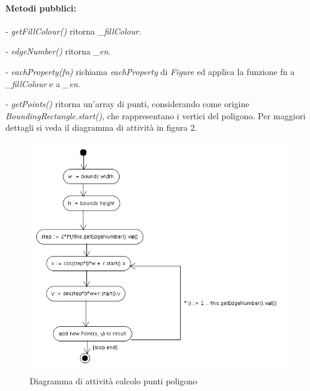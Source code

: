 \paragraph{Metodi pubblici:}
\begin{elencopuntato}[\subsubsecindent]
\item[-] \textit{getFillColour()} ritorna \textit{{\_}fillColour}.
\item[-] \textit{edgeNumber()} ritorna \textit{{\_}en}.
\item[-] \textit{eachProperty(fn)} richiama \textit{eachProperty} di \textit{Figure} ed applica la funzione fn a \textit{{\_}fillColour} e a \textit{{\_en}}.
\item[-] \textit{getPoints()} ritorna un'array di punti, considerando come origine \textit{BoundingRectangle.start()}, che rappresentano i vertici del poligono. Per maggiori dettagli si veda il diagramma di attivit\`a in figura 2.

\begin{figure}[!ht]
\centering
\includegraphics[scale=0.5]{polygonpoints.png}
\caption{Diagramma di attivit\`a calcolo punti poligono}
\end{figure}


\end{elencopuntato}
